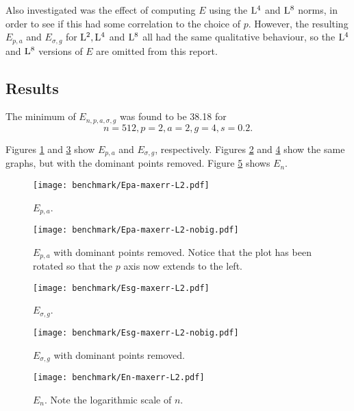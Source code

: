 Also investigated was the effect of computing $E$ using the $\Lp[4]$
and $\Lp[8]$ norms, in order to see if this had some correlation to
the choice of $p$. However, the resulting $E_{p,a}$ and $E_{\sigma,g}$ for
$\Lp[2], \Lp[4]$ and $\Lp[8]$ all had the same qualitative behaviour,
so the $\Lp[4]$ and $\Lp[8]$ versions of $E$ are omitted from this
report.

\subsection{Results}

The minimum of $E_{n,p,a,\sigma,g}$ was found to be 38.18 for
\begin{equation*}
  n=512, p=2, a=2, g=4, s=0.2.
\end{equation*}

Figures \ref{fig:Epa-maxerr-L2} and \ref{fig:Esg-maxerr-L2} show
$E_{p,a}$ and $E_{\sigma,g}$, respectively. Figures
\ref{fig:Epa-maxerr-L2-nobig} and \ref{fig:Esg-maxerr-L2-nobig} show
the same graphs, but with the dominant points removed. Figure
\ref{fig:En-maxerr-L2} shows $E_n$.

\begin{figure}[hb]
  \centering
  \texttt{[image: benchmark/Epa-maxerr-L2.pdf]}
  \caption{$E_{p,a}$.}
  \label{fig:Epa-maxerr-L2}
\end{figure}

\begin{figure}
  \centering
  \texttt{[image: benchmark/Epa-maxerr-L2-nobig.pdf]}
  \caption{$E_{p,a}$ with dominant points removed. Notice that the
    plot has been rotated so that the $p$ axis now extends to the
    left.}
  \label{fig:Epa-maxerr-L2-nobig}
\end{figure}

\begin{figure}
  \centering
  \texttt{[image: benchmark/Esg-maxerr-L2.pdf]}
  \caption{$E_{\sigma,g}$.}
  \label{fig:Esg-maxerr-L2}
\end{figure}

\begin{figure}
  \centering
  \texttt{[image: benchmark/Esg-maxerr-L2-nobig.pdf]}
  \caption{$E_{\sigma,g}$ with dominant points removed.}
  \label{fig:Esg-maxerr-L2-nobig}
\end{figure}

\begin{figure}
  \centering
  \texttt{[image: benchmark/En-maxerr-L2.pdf]}
  \caption{$E_n$. Note the logarithmic scale of $n$.}
  \label{fig:En-maxerr-L2}
\end{figure}


